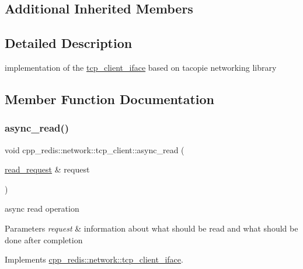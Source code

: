 \subsection*{Additional Inherited Members}


\subsection{Detailed Description}
implementation of the \mbox{\hyperlink{classcpp__redis_1_1network_1_1tcp__client__iface}{tcp\+\_\+client\+\_\+iface}} based on tacopie networking library 

\subsection{Member Function Documentation}
\mbox{\label{classcpp__redis_1_1network_1_1tcp__client_a5eed4225fcd01e3108580d863c94c2cc}} 
\subsubsection{\texorpdfstring{async\+\_\+read()}{async\_read()}}
{\footnotesize\ttfamily void cpp\+\_\+redis\+::network\+::tcp\+\_\+client\+::async\+\_\+read (\begin{DoxyParamCaption}\item[{\mbox{\hyperlink{structcpp__redis_1_1network_1_1tcp__client__iface_1_1read__request}{read\+\_\+request}} \&}]{request }\end{DoxyParamCaption})\hspace{0.3cm}{\ttfamily [virtual]}}

async read operation


\begin{DoxyParams}{Parameters}
{\em request} & information about what should be read and what should be done after completion \\
\hline
\end{DoxyParams}


Implements \mbox{\hyperlink{classcpp__redis_1_1network_1_1tcp__client__iface_ae1f9fa87002273a0caf340407bb68ade}{cpp\+\_\+redis\+::network\+::tcp\+\_\+client\+\_\+iface}}.

